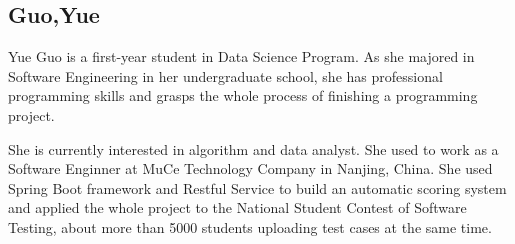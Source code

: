 \subsection{Guo,Yue}
Yue Guo is a first-year student in Data Science Program. As she majored in Software Engineering in her undergraduate school, she has professional programming skills and grasps the whole process of finishing a programming project.

She is currently interested in algorithm and data analyst. She used to work as a Software Enginner at MuCe Technology Company in Nanjing, China. She used Spring Boot framework and Restful Service to build an automatic scoring system and applied the whole project to the National Student Contest of Software Testing, about more than 5000 students uploading test cases at the same time.
